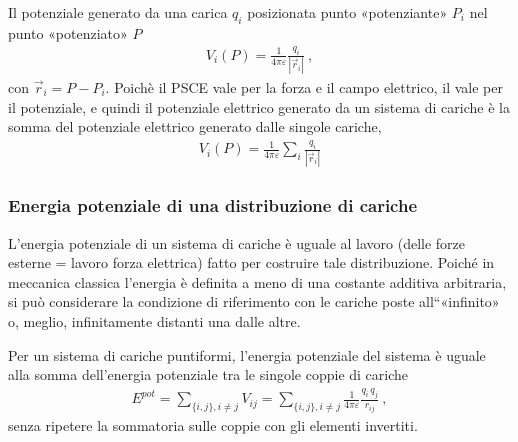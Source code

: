 \documentclass[letterpaper,10pt,italian]{jupyterBook}
\begin{document}
\sphinxAtStartPar
Il potenziale generato da una carica \(q_i\) posizionata punto «potenziante» \(P_i\) nel punto «potenziato» \(P\)
\begin{equation*}
\begin{split}V_i(P) = \frac{1}{4 \pi \varepsilon} \frac{q_i}{|\vec{r}_i|} \ ,\end{split}
\end{equation*}
\sphinxAtStartPar
con \(\vec{r}_i = P - P_i\). Poichè il PSCE vale per la forza e il campo elettrico, il  vale per il potenziale, e quindi il potenziale elettrico generato da un sistema di cariche è la somma del potenziale elettrico generato dalle singole cariche,
\begin{equation*}
\begin{split}V_i(P) = \frac{1}{4 \pi \varepsilon} \sum_i \frac{q_{i}}{\left|\vec{r}_{i}\right|} \end{split}
\end{equation*}

\subsubsection{Energia potenziale di una distribuzione di cariche}
\label{\detokenize{ch/electromagnetism/electrostatics:energia-potenziale-di-una-distribuzione-di-cariche}}\label{\detokenize{ch/electromagnetism/electrostatics:physics-hs-electromagnetism-electrostatics-e-field-energy}}
\sphinxAtStartPar
L’energia potenziale di un sistema di cariche è uguale al lavoro (delle forze esterne = \sphinxhyphen{} lavoro forza elettrica) fatto per costruire tale distribuzione. Poiché in meccanica classica l’energia è definita a meno di una costante additiva arbitraria, si può considerare la condizione di riferimento con le cariche poste all“«infinito» o, meglio, infinitamente distanti una dalle altre.

\sphinxAtStartPar
Per un sistema di cariche puntiformi, l’energia potenziale del sistema è uguale alla somma dell’energia potenziale tra le singole coppie di cariche
\begin{equation*}
\begin{split}E^{pot} = \sum_{\{i,j\}, i \ne j} V_{ij} = \sum_{\{i,j\}, i \ne j} \frac{1}{4 \pi \varepsilon} \frac{{q}_{i} \, q_{j}}{r_{ij}} \ ,\end{split}
\end{equation*}
\sphinxAtStartPar
senza ripetere la sommatoria sulle coppie con gli elementi invertiti.
\end{document}
